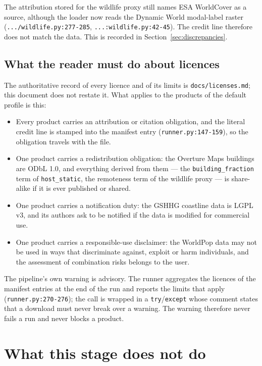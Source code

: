 \documentclass[11pt,a4paper]{article}
\newcommand{\code}[1]{\texttt{#1}}
\begin{document}
The attribution stored for the wildlife proxy still names ESA WorldCover as a
source, although the loader now reads the Dynamic World modal-label raster
(\code{.../wildlife.py:277-285}, \code{...:wildlife.py:42-45}). The credit
line therefore does not match the data. This is recorded in
Section~\ref{sec:discrepancies}.

\subsection{What the reader must do about licences}

The authoritative record of every licence and of its limits is
\code{docs/licenses.md}; this document does not restate it. What applies to
the products of the default profile is this:

\begin{itemize}
\item Every product carries an attribution or citation obligation, and the
literal credit line is stamped into the manifest entry
(\code{runner.py:147-159}), so the obligation travels with the file.
\item One product carries a redistribution obligation: the Overture Maps
buildings are ODbL 1.0, and everything derived from them --- the
\code{building\_fraction} term of \code{host\_static}, the remoteness term
of the wildlife proxy --- is share-alike if it is ever
published or shared.
\item One product carries a notification duty: the GSHHG coastline data is
LGPL v3, and its authors ask to be notified if the data is modified for
commercial use.
\item One product carries a responsible-use disclaimer: the WorldPop data may
not be used in ways that discriminate against, exploit or harm individuals,
and the assessment of combination risks belongs to the user.
\end{itemize}

The pipeline's own warning is advisory. The runner aggregates the licences
of the manifest entries at the end of the run and reports the limits that
apply (\code{runner.py:270-276}); the call is wrapped in a
\code{try}/\code{except} whose comment states that a download must never
break over a warning. The warning therefore never fails a run and never
blocks a product.

\section{What this stage does not do}
\label{sec:absences}
\end{document}
